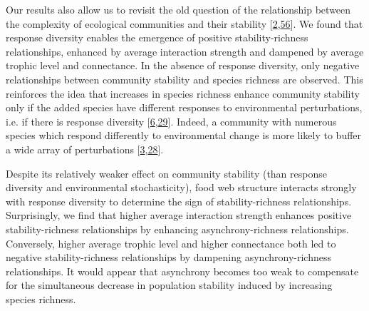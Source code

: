 \documentclass[
]{article}
\begin{document}
Our results also allow us to revisit the old question of the relationship
between the complexity of ecological communities and their stability
{[}\protect\hyperlink{ref-may_will_1972}{2},\protect\hyperlink{ref-angelis_stability_1975}{56}{]}. We found that response diversity
enables the emergence of positive stability-richness relationships, enhanced by
average interaction strength and dampened by average trophic level and
connectance. In the absence of response diversity, only negative relationships
between community stability and species richness are observed. This reinforces
the idea that increases in species richness enhance community stability only if
the added species have different responses to environmental perturbations, i.e.
if there is response diversity {[}\protect\hyperlink{ref-de_mazancourt_predicting_2013}{6},\protect\hyperlink{ref-thebault_trophic_2005}{29}{]}. Indeed, a community with numerous species which
respond differently to environmental change is more likely to buffer a wide
array of perturbations {[}\protect\hyperlink{ref-yachi_biodiversity_1999}{3},\protect\hyperlink{ref-ives_stability_2000}{28}{]}.

Despite its relatively weaker effect on community stability (than response
diversity and environmental stochasticity), food web structure interacts
strongly with response diversity to determine the sign of stability-richness
relationships. Surprisingly, we find that higher average interaction strength
enhances positive stability-richness relationships by enhancing
asynchrony-richness relationships. Conversely, higher average trophic level and
higher connectance both led to negative stability-richness relationships by
dampening asynchrony-richness relationships. It would appear that asynchrony
becomes too weak to compensate for the simultaneous decrease in population
stability induced by increasing species richness.
\end{document}
